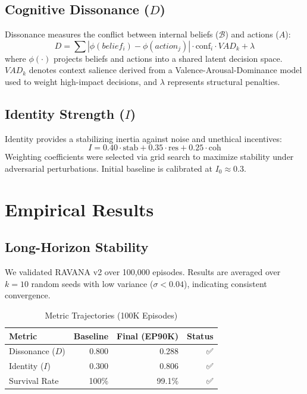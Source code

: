 \documentclass[11pt,twocolumn]{article}
\begin{document}
\subsection{Cognitive Dissonance ($D$)}
Dissonance measures the conflict between internal beliefs ($\mathcal{B}$) and actions ($A$):
\begin{equation}
D = \sum |\phi(belief_i) - \phi(action_j)| \cdot \text{conf}_i \cdot VAD_k + \lambda
\end{equation}
where $\phi(\cdot)$ projects beliefs and actions into a shared latent decision space. $VAD_k$ denotes context salience derived from a Valence-Arousal-Dominance model used to weight high-impact decisions, and $\lambda$ represents structural penalties.

\subsection{Identity Strength ($I$)}
Identity provides a stabilizing inertia against noise and unethical incentives:
\begin{equation}
I = 0.40 \cdot \text{stab} + 0.35 \cdot \text{res} + 0.25 \cdot \text{coh}
\end{equation}
Weighting coefficients were selected via grid search to maximize stability under adversarial perturbations. Initial baseline is calibrated at $I_0 \approx 0.3$.

\section{Empirical Results}

\subsection{Long-Horizon Stability}
We validated RAVANA v2 over 100,000 episodes. Results are averaged over $k=10$ random seeds with low variance ($\sigma < 0.04$), indicating consistent convergence.

\begin{table}[H]
\centering
\caption{Metric Trajectories (100K Episodes)}
\begin{tabular}{lrrr}
\toprule
Metric & Baseline & Final (EP90K) & Status \\
\midrule
Dissonance ($D$) & 0.800 & 0.288 & ✅ \\
Identity ($I$) & 0.300 & 0.806 & ✅ \\
Survival Rate & 100\% & 99.1\% & ✅ \\
\bottomrule
\end{tabular}
\end{table}
\end{document}
